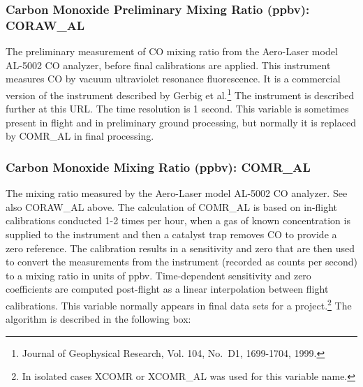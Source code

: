 \documentclass[
  english,
]{book}
\begin{document}
\hypertarget{coraw-al}{%
\subsubsection*{Carbon Monoxide Preliminary Mixing Ratio (ppbv):
CORAW\_AL}\label{coraw-al}}

The preliminary measurement of CO mixing ratio from the Aero-Laser model
AL-5002 CO analyzer, before final calibrations are applied. This
instrument measures CO by vacuum ultraviolet resonance fluorescence. It
is a commercial version of the instrument described by Gerbig et
al.\footnote{Journal of Geophysical Research, Vol. 104, No.~D1,
  1699-1704, 1999.} The instrument is described further at this URL. The
time resolution is 1 second. This variable is sometimes present in
flight and in preliminary ground processing, but normally it is replaced
by COMR\_AL in final processing.

\hypertarget{comr-al}{%
\subsubsection*{Carbon Monoxide Mixing Ratio (ppbv):
COMR\_AL}\label{comr-al}}

The mixing ratio measured by the Aero-Laser model AL-5002 CO analyzer.
See also CORAW\_AL above. The calculation of COMR\_AL is based on
in-flight calibrations conducted 1-2 times per hour, when a gas of known
concentration is supplied to the instrument and then a catalyst trap
removes CO to provide a zero reference. The calibration results in a
sensitivity and zero that are then used to convert the measurements from
the instrument (recorded as counts per second) to a mixing ratio in
units of ppbv. Time-dependent sensitivity and zero coefficients are
computed post-flight as a linear interpolation between flight
calibrations. This variable normally appears in final data sets for a
project.\footnote{In isolated cases XCOMR or XCOMR\_AL was used for this
  variable name.} The algorithm is described in the following box:
\end{document}
